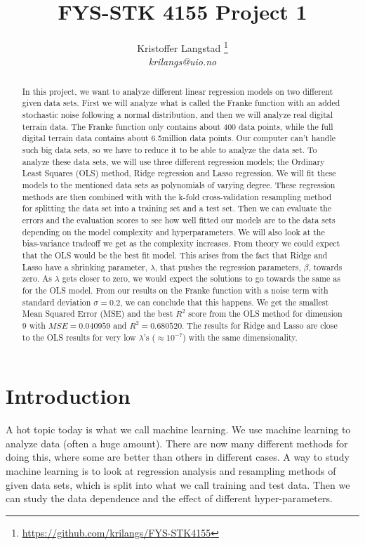 \documentclass[12pt,a4paper,english]{article}
\title{FYS-STK 4155 Project 1}
\date{}
\author{ Kristoffer Langstad \footnote{\url{https://github.com/krilangs/FYS-STK4155}}\\ \textit{krilangs@uio.no}}
\begin{document}
\maketitle
\begin{abstract}
In this project, we want to analyze different linear regression models on two different given data sets.  First we will analyze what is called the Franke function with an added stochastic noise following a normal distribution, and then we will analyze real digital terrain data. The Franke function only contains about 400 data points, while the full digital terrain data contains about 6.5million data points. Our computer can't handle such big data sets, so we have to reduce it to be able to analyze the data set. To analyze these data sets, we will use three different regression models; the Ordinary Least Squares (OLS) method, Ridge regression and Lasso regression. We will fit these models to the mentioned data sets as polynomials of varying degree. These regression methods are then combined with with the k-fold cross-validation resampling method for splitting the data set into a training set and a test set. Then we can evaluate the errors and the evaluation scores to see how well fitted our models are to the data sets depending on the model complexity and hyperparameters. We will also look at the bias-variance tradeoff we get as the complexity increases. From theory we could expect that the OLS would be the best fit model. This arises from the fact that Ridge and Lasso have a shrinking parameter, $\lambda$, that pushes the regression parameters, $\beta$, towards zero. As $\lambda$ gets closer to zero, we would expect the solutions to go towards the same as for the OLS model. From our results on the Franke function with a noise term with standard deviation $\sigma=0.2$, we can conclude that this happens. We get the smallest Mean Squared Error (MSE) and the best $R^2$ score from the OLS method for dimension 9 with $MSE=0.040959$ and $R^2=0.680520$. The results for Ridge and Lasso are close to the OLS results for very low $\lambda$'s ($\approx 10^{-7}$) with the same dimensionality.
\end{abstract}

\section{Introduction}
A hot topic today is what we call machine learning. We use machine learning to analyze data (often a huge amount). There are now many different methods for doing this, where some are better than others in different cases. A way to study machine learning is to look at regression analysis and resampling methods of given data sets, which is split into what we call training and test data. Then we can study the data dependence and the effect of different hyper-parameters.
\end{document}
